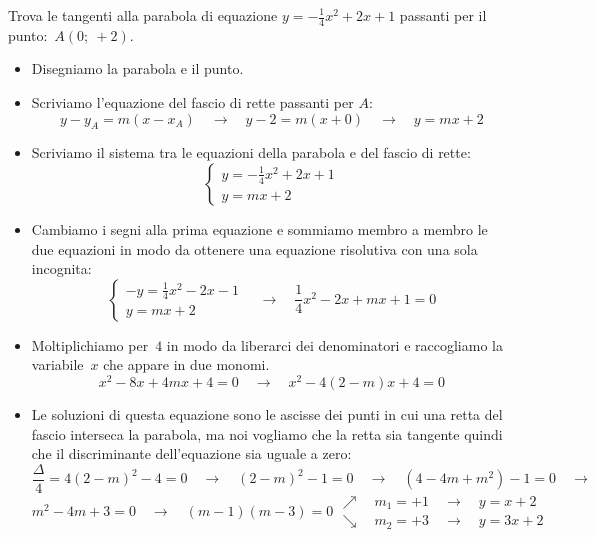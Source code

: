 \begin{esempio}
 Trova le tangenti alla parabola di equazione \(y=-\frac{1}{4}x^2+2x +1\) 
 passanti per il punto:~\(A(0;~+2)\).
 
 \begin{itemize}
  \item Disegniamo la parabola e il punto.
  \item Scriviamo l'equazione del fascio di rette passanti per \(A\):
\[y-y_A = m(x-x_A) \quad \rightarrow \quad 
y-2 = m\left(x+0\right)
\quad \rightarrow \quad y=mx+2\]
  \item Scriviamo il sistema tra le equazioni della parabola e del fascio di 
   rette:
\[\left\{\begin{array}{l}
  y=-\frac{1}{4}x^2+2x +1\\
  y=mx+2
\end{array}\right. \]
  \item Cambiamo i segni alla prima equazione e sommiamo membro a membro le
   due equazioni in modo da ottenere una equazione risolutiva con una sola 
   incognita:
\[\left\{\begin{array}{l}
  -y=\frac{1}{4}x^2-2x-1\\
  y=mx+2
\end{array}\right. \quad \rightarrow \quad 
\frac{1}{4}x^2-2x+mx+1=0\]
  \item Moltiplichiamo per~\(4\) in modo da liberarci dei denominatori e 
   raccogliamo la variabile~\(x\) che appare in due monomi.
\[x^2-8x+4mx+4=0 \quad \rightarrow \quad x^2-4(2-m)x+4=0\]
  \item Le soluzioni di questa equazione sono le ascisse dei punti in cui una 
   retta del fascio interseca la parabola, ma noi vogliamo che la retta sia
   tangente quindi che il discriminante dell'equazione sia uguale a zero:
\[\frac{\Delta}{4}=4(2-m)^2-4=0 \quad \rightarrow \quad 
(2-m)^2-1=0 \quad \rightarrow \quad
(4-4m+m^2)-1=0 \quad \rightarrow \quad\]
\[m^2-4m+3=0 \quad \rightarrow \quad
(m-1)(m-3)=0 
 \begin{array}{l}
  \nearrow \quad m_1=+1 \quad \rightarrow \quad y=x+2\\
  \searrow \quad m_2=+3 \quad \rightarrow \quad y=3x+2
 \end{array}\]
 \end{itemize}
\end{esempio}

